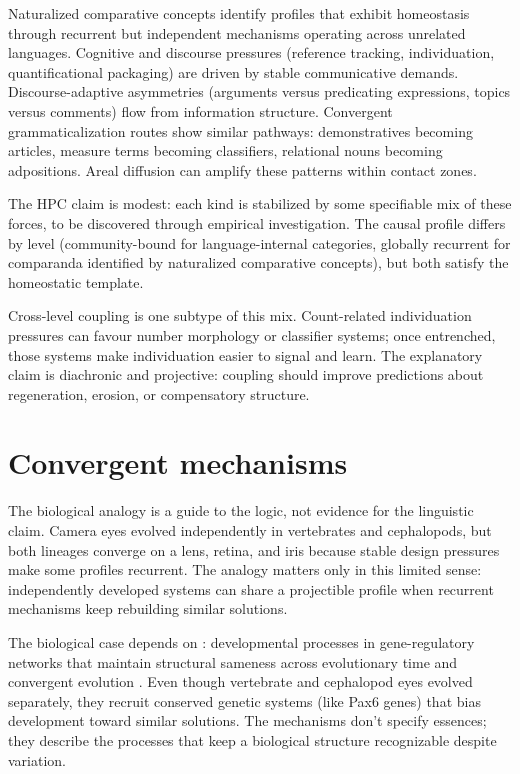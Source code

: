 \documentclass[12pt]{article}
\begin{document}
Naturalized comparative concepts identify profiles that exhibit homeostasis through recurrent but independent mechanisms operating across unrelated languages. Cognitive and discourse pressures (reference tracking, individuation, quantificational packaging) are driven by stable communicative demands. Discourse-adaptive asymmetries (arguments versus predicating expressions, topics versus comments) flow from information structure. Convergent grammaticalization routes show similar pathways: demonstratives becoming articles, measure terms becoming classifiers, relational nouns becoming adpositions. Areal diffusion can amplify these patterns within contact zones.

The HPC claim is modest: each kind is stabilized by some specifiable mix of these forces, to be discovered through empirical investigation. The causal profile differs by level (community-bound for language-internal categories, globally recurrent for comparanda identified by naturalized comparative concepts), but both satisfy the homeostatic template.

Cross-level coupling is one subtype of this mix. Count-related individuation pressures can favour number morphology or classifier systems; once entrenched, those systems make individuation easier to signal and learn. The explanatory claim is diachronic and projective: coupling should improve predictions about regeneration, erosion, or compensatory structure.

\section{Convergent mechanisms}\label{sec:eyes}
The biological analogy is a guide to the logic, not evidence for the linguistic claim. Camera eyes evolved independently in vertebrates and cephalopods, but both lineages converge on a lens, retina, and iris because stable design pressures make some profiles recurrent. The analogy matters only in this limited sense: independently developed systems can share a projectible profile when recurrent mechanisms keep rebuilding similar solutions.

The biological case depends on : developmental processes in gene-regulatory networks that maintain structural sameness across evolutionary time and convergent evolution \parencite{ShubinTabinCarroll2009,Wagner2014}. Even though vertebrate and cephalopod eyes evolved separately, they recruit conserved genetic systems (like Pax6 genes) that bias development toward similar solutions. The mechanisms don't specify essences; they describe the processes that keep a biological structure recognizable despite variation.
\end{document}

